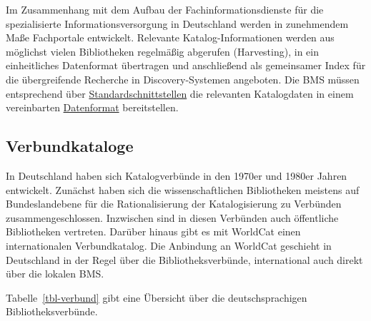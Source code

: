 \documentclass[
  11pt,
  letterpaper,
  DIV=11,
  twoside]{scrreprt}
\begin{document}
Im Zusammenhang mit dem Aufbau der Fachinformationsdienste für die
spezialisierte Informationsversorgung in Deutschland werden in
zunehmendem Maße Fachportale entwickelt. Relevante Katalog-Informationen
werden aus möglichst vielen Bibliotheken regelmäßig abgerufen
(Harvesting), in ein einheitliches Datenformat übertragen und
anschließend als gemeinsamer Index für die übergreifende Recherche in
Discovery-Systemen angeboten. Die BMS müssen entsprechend über
\hyperref[datenformate-und-schnittstellen]{Standardschnittstellen} die
relevanten Katalogdaten in einem vereinbarten
\hyperref[bibliografische-metadaten]{Datenformat} bereitstellen.

\subsection{Verbundkataloge}\label{verbundkataloge}

In Deutschland haben sich Katalogverbünde in den 1970er und 1980er
Jahren entwickelt. Zunächst haben sich die wissenschaftlichen
Bibliotheken meistens auf Bundeslandebene für die Rationalisierung der
Katalogisierung zu Verbünden zusammengeschlossen. Inzwischen sind in
diesen Verbünden auch öffentliche Bibliotheken vertreten. Darüber hinaus
gibt es mit WorldCat einen internationalen Verbundkatalog. Die Anbindung
an WorldCat geschieht in Deutschland in der Regel über die
Bibliotheksverbünde, international auch direkt über die lokalen BMS.

Tabelle~\ref{tbl-verbund} gibt eine Übersicht über die deutschsprachigen
Bibliotheksverbünde.
\end{document}
